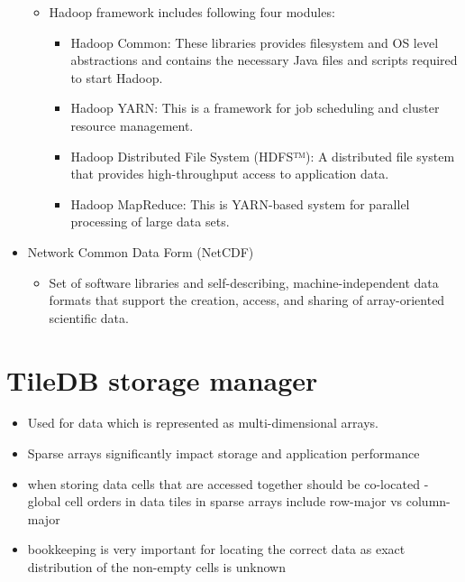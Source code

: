 \begin{itemize}
\begin{itemize}
		\item Hadoop framework includes following four modules:
		\begin{itemize}
			\item Hadoop Common: These libraries provides filesystem and OS level abstractions and contains the necessary Java files and scripts required to start Hadoop.
			\item Hadoop YARN: This is a framework for job scheduling and cluster resource management.
			\item Hadoop Distributed File System (HDFS™): A distributed file system that provides high-throughput access to application data.
			\item Hadoop MapReduce: This is YARN-based system for parallel processing of large data sets.
		\end{itemize}
	\end{itemize}
	\item Network Common Data Form (NetCDF)
	\begin{itemize}
		\item Set of software libraries and self-describing, machine-independent data formats that support the creation, access, and sharing of array-oriented scientific data.
	\end{itemize}
\end{itemize}

\section{TileDB storage manager}
\begin{itemize}
	\item Used for data which is represented as multi-dimensional arrays.
	\item Sparse arrays significantly impact storage and application performance
	\item when storing data cells that are accessed together should be co-located -  global cell orders in data tiles in sparse arrays include row-major vs column-major
	\item bookkeeping is very important for locating the correct data as exact distribution of the non-empty cells is unknown
\end{itemize}

